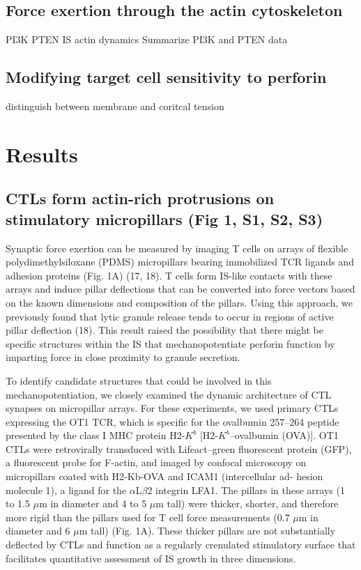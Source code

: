 \subsection{Force exertion through the actin cytoskeleton}
PI3K PTEN IS actin dynamics
Summarize PI3K and PTEN data

\subsection{Modifying target cell sensitivity to perforin}
distinguish between membrane and coritcal tension

\section{Results} 

\subsection{CTLs form actin-rich protrusions on stimulatory micropillars (Fig 1, S1, S2, S3)}
Synaptic force exertion can be measured by imaging T cells on arrays of flexible polydimethylsiloxane (PDMS) micropillars bearing immobilized TCR ligands and adhesion proteins (Fig. 1A) (17, 18). T cells form IS-like contacts with these arrays and induce pillar deflections that can be converted into force vectors based on the known dimensions and composition of the pillars. Using this approach, we previously found that lytic granule release tends to occur in regions of active pillar deflection (18). This result raised the possibility that there might be specific structures within the IS that mechanopotentiate perforin function by imparting force in close proximity to granule secretion.

To identify candidate structures that could be involved in this mechanopotentiation, we closely examined the dynamic architecture of CTL synapses on micropillar arrays. For these experiments, we used primary CTLs expressing the OT1 TCR, which is specific for the ovalbumin 257–264 peptide presented by the class I MHC protein H2-$K^{b}$ [H2-$K^{b}$–ovalbumin (OVA)]. OT1 CTLs were retrovirally transduced with Lifeact–green fluorescent protein (GFP), a fluorescent probe for F-actin, and imaged by confocal microscopy on micropillars coated with H2-Kb-OVA and ICAM1 (intercellular ad- hesion molecule 1), a ligand for the $\alpha$L$\beta$2 integrin LFA1. The pillars in these arrays (1 to 1.5 $\mu$m in diameter and 4 to 5 $\mu$m tall) were thicker, shorter, and therefore more rigid than the pillars used for T cell force measurements (0.7 $\mu$m in diameter and 6 $\mu$m tall) (Fig. 1A). These thicker pillars are not substantially deflected by CTLs and function as a regularly crenulated stimulatory surface that facilitates quantitative assessment of IS growth in three dimensions.

